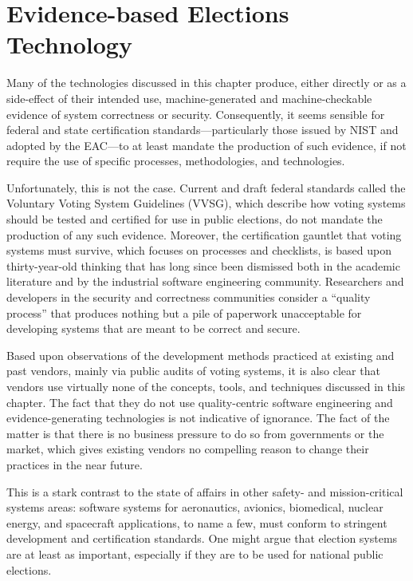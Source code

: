 \section{Evidence-based Elections Technology}

Many of the technologies discussed in this chapter produce, either
directly or as a side-effect of their intended use, machine-generated
and machine-checkable evidence of system correctness or security.
Consequently, it seems sensible for federal and state certification
standards---particularly those issued by NIST and adopted by the
EAC---to at least mandate the production of such evidence, if not
require the use of specific processes, methodologies, and
technologies.

Unfortunately, this is not the case.  Current and draft federal
standards called the Voluntary Voting System Guidelines (VVSG), which
describe how voting systems should be tested and certified for use in
public elections, do not mandate the production of any such
evidence. Moreover, the certification gauntlet that voting systems
must survive, which focuses on processes and checklists, is based upon
thirty-year-old thinking that has long since been dismissed both in
the academic literature and by the industrial software engineering
community. Researchers and developers in the security and correctness
communities consider a ``quality process'' that produces nothing but a
pile of paperwork unacceptable for developing systems that are meant
to be correct and secure.

Based upon observations of the development methods practiced at
existing and past vendors, mainly via public audits of voting systems,
it is also clear that vendors use virtually none of the concepts,
tools, and techniques discussed in this chapter.  The fact that they
do not use quality-centric software engineering and
evidence-generating technologies is not indicative of ignorance.  The
fact of the matter is that there is no business pressure to do so from
governments or the market, which gives existing vendors no compelling
reason to change their practices in the near future.

This is a stark contrast to the state of affairs in other safety- and
mission-critical systems areas: software systems for aeronautics,
avionics, biomedical, nuclear energy, and spacecraft applications, to
name a few, must conform to stringent development and certification
standards.  One might argue that election systems are at least as
important, especially if they are to be used for national public
elections.

